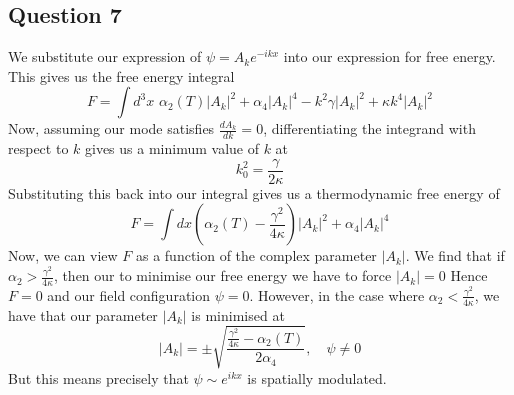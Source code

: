 \subsection{Question 7} 
We substitute our expression of $\psi = A_k e^{ - ikx} $ into our expression for free energy. This gives us the free energy integral 
\[ 
	F = \int d^3 x\, \,  \alpha_2 (T) |A_k|^2 + \alpha_4 |A_k|^4  - k^2 \gamma |A_k|^2 + \kappa k^4 |A_k|^2
\] Now, assuming our mode satisfies $\frac{ dA_k }{ dk }  = 0$, differentiating the integrand with respect to $k$ gives us a minimum value of $ k$ at 
\[ 
	k_0^2 = \frac{ \gamma}{ 2 \kappa } 
\] Substituting this back into our integral gives us a thermodynamic free energy of 
\[ 
	F  = \int dx \left( \alpha_2( T) - \frac{ \gamma^2}{ 4 \kappa } \right) |A_k|^2 + \alpha_4 |A_k|^4 
\]  
Now, we can view $F$ as a function of the complex parameter $|A_k|$. We find that if $\alpha_2 > \frac{ \gamma^ 2}{ 4 \kappa } $, then our to minimise our free energy we have to force $|A_k| = 0 $ Hence $F = 0$ and our field configuration $\psi = 0$. However, in the case where $\alpha_2 <  \frac{ \gamma^ 2}{ 4 \kappa} $, we have that our parameter $|A_k|$ is minimised at \[ 
|A_k | =  \pm \sqrt { \frac{ \frac{ \gamma^ 2}{ 4 \kappa} - \alpha_2 ( T ) }{ 2 \alpha_4 }  }  , \quad \psi \neq 0 
\] But this means precisely that $\psi \sim e^{ ikx} $ is spatially modulated.




